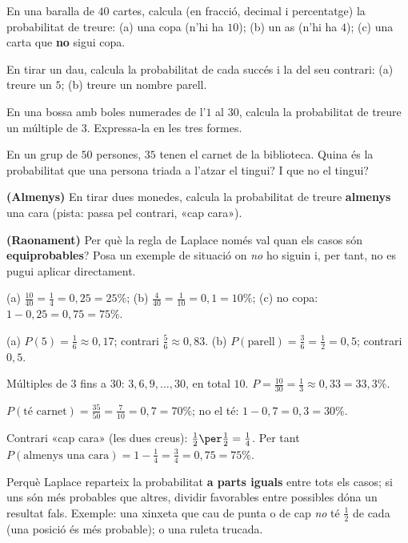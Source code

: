 \begin{exercicis}
\begin{exlist}
  \item En una baralla de $40$ cartes, calcula (en fracció, decimal i percentatge) la
        probabilitat de treure: (a) una copa (n'hi ha $10$); (b) un as (n'hi ha $4$);
        (c) una carta que \textbf{no} sigui copa.
  \item En tirar un dau, calcula la probabilitat de cada succés i la del seu contrari:
        (a) treure un $5$; (b) treure un nombre parell.
  \item En una bossa amb boles numerades de l'$1$ al $30$, calcula la probabilitat de
        treure un múltiple de $3$. Expressa-la en les tres formes.
  \item En un grup de $50$ persones, $35$ tenen el carnet de la biblioteca. Quina és la
        probabilitat que una persona triada a l'atzar el tingui? I que no el tingui?
  \item \textbf{(Almenys)} En tirar dues monedes, calcula la probabilitat de treure
        \textbf{almenys} una cara (pista: passa pel contrari, «cap cara»).
  \item \textbf{(Raonament)} Per què la regla de Laplace només val quan els casos són
        \textbf{equiprobables}? Posa un exemple de situació on \emph{no} ho siguin i, per
        tant, no es pugui aplicar directament.
\end{exlist}
\end{exercicis}

\begin{solucions}
\begin{sollist}
  \item (a) $\frac{10}{40}=\frac{1}{4}=0,25=25\%$; (b) $\frac{4}{40}=\frac{1}{10}=0,1=10\%$;
        (c) no copa: $1-0,25=0,75=75\%$.
  \item (a) $P(5)=\frac{1}{6}\approx 0,17$; contrari $\frac{5}{6}\approx 0,83$. \quad
        (b) $P(\text{parell})=\frac{3}{6}=\frac{1}{2}=0,5$; contrari $0,5$.
  \item Múltiples de $3$ fins a $30$: $3,6,9,\dots,30$, en total $10$.
        $P=\frac{10}{30}=\frac{1}{3}\approx 0,33=33,3\%$.
  \item $P(\text{té carnet})=\frac{35}{50}=\frac{7}{10}=0,7=70\%$; no el té:
        $1-0,7=0,3=30\%$.
  \item Contrari «cap cara» (les dues creus): $\frac{1}{2}\per\frac{1}{2}=\frac{1}{4}$.
        Per tant $P(\text{almenys una cara})=1-\frac{1}{4}=\frac{3}{4}=0,75=75\%$.
  \item Perquè Laplace reparteix la probabilitat \textbf{a parts iguals} entre tots els
        casos; si uns són més probables que altres, dividir favorables entre possibles
        dóna un resultat fals. Exemple: una xinxeta que cau de punta o de cap \emph{no}
        té $\frac{1}{2}$ de cada (una posició és més probable); o una ruleta trucada.
\end{sollist}
\end{solucions}
